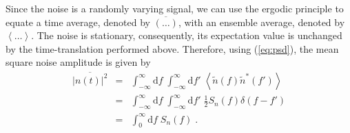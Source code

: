Since the noise is a randomly varying signal, we can use the ergodic principle to equate a time average, denoted by $\overline{\left(\ldots\right)}$, with an ensemble average, denoted by $\left<\ldots\right>$. The noise is stationary, consequently, its expectation value is unchanged by the time-translation performed above. Therefore, using (\ref{eq:psd}), the mean square noise amplitude is given by
\begin{eqnarray}\label{eq:meansquare1}
\overline{\left|n(t)\right|^{2}} &=& \int_{-\infty}^{\infty}\mathrm{d}f\;\int_{-\infty}^{\infty}\mathrm{d}f'\;\left<\tilde{n}(f)\tilde{n}^{*}(f')\right> \\
&=& \int_{-\infty}^{\infty}\mathrm{d}f\;\int_{-\infty}^{\infty}\mathrm{d}f'\;\frac{1}{2}S_{n}(f)\delta(f-f') \nonumber \\
&=& \int_{0}^{\infty}\mathrm{d}f\; S_{n}(f) \;.
\label{eq:meansquare2}
\end{eqnarray}

